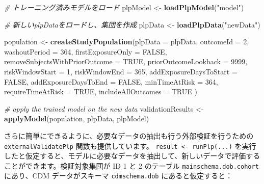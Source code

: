 \documentclass[
  11pt]{book}
\newenvironment{Shaded}{\begin{snugshade}}{\end{snugshade}}
\newcommand{\AttributeTok}[1]{\textcolor[rgb]{0.13,0.29,0.53}{#1}}
\newcommand{\CommentTok}[1]{\textcolor[rgb]{0.56,0.35,0.01}{\textit{#1}}}
\newcommand{\ConstantTok}[1]{\textcolor[rgb]{0.56,0.35,0.01}{#1}}
\newcommand{\DecValTok}[1]{\textcolor[rgb]{0.00,0.00,0.81}{#1}}
\newcommand{\FunctionTok}[1]{\textcolor[rgb]{0.13,0.29,0.53}{\textbf{#1}}}
\newcommand{\NormalTok}[1]{#1}
\newcommand{\OtherTok}[1]{\textcolor[rgb]{0.56,0.35,0.01}{#1}}
\newcommand{\StringTok}[1]{\textcolor[rgb]{0.31,0.60,0.02}{#1}}
\theoremstyle{definition}
\theoremstyle{definition}
\theoremstyle{definition}
\theoremstyle{definition}
\theoremstyle{remark}
\begin{document}
\begin{Shaded}
\begin{Highlighting}[]
\CommentTok{\# トレーニング済みモデルをロード}
\NormalTok{plpModel }\OtherTok{\textless{}{-}} \FunctionTok{loadPlpModel}\NormalTok{(}\StringTok{"model"}\NormalTok{)}

\CommentTok{\# 新しいplpDataをロードし、集団を作成}
\NormalTok{plpData }\OtherTok{\textless{}{-}} \FunctionTok{loadPlpData}\NormalTok{(}\StringTok{"newData"}\NormalTok{)}

\NormalTok{population }\OtherTok{\textless{}{-}} \FunctionTok{createStudyPopulation}\NormalTok{(}\AttributeTok{plpData =}\NormalTok{ plpData,}
                                    \AttributeTok{outcomeId =} \DecValTok{2}\NormalTok{,}
                                    \AttributeTok{washoutPeriod =} \DecValTok{364}\NormalTok{,}
                                    \AttributeTok{firstExposureOnly =} \ConstantTok{FALSE}\NormalTok{,}
                                    \AttributeTok{removeSubjectsWithPriorOutcome =} \ConstantTok{TRUE}\NormalTok{,}
                                    \AttributeTok{priorOutcomeLookback =} \DecValTok{9999}\NormalTok{,}
                                    \AttributeTok{riskWindowStart =} \DecValTok{1}\NormalTok{,}
                                    \AttributeTok{riskWindowEnd =} \DecValTok{365}\NormalTok{,}
                                    \AttributeTok{addExposureDaysToStart =} \ConstantTok{FALSE}\NormalTok{,}
                                    \AttributeTok{addExposureDaysToEnd =} \ConstantTok{FALSE}\NormalTok{,}
                                    \AttributeTok{minTimeAtRisk =} \DecValTok{364}\NormalTok{,}
                                    \AttributeTok{requireTimeAtRisk =} \ConstantTok{TRUE}\NormalTok{,}
                                    \AttributeTok{includeAllOutcomes =} \ConstantTok{TRUE}
\NormalTok{)}

\CommentTok{\# apply the trained model on the new data}
\NormalTok{validationResults }\OtherTok{\textless{}{-}} \FunctionTok{applyModel}\NormalTok{(population, plpData, plpModel)}
\end{Highlighting}
\end{Shaded}

さらに簡単にできるように、必要なデータの抽出も行う外部検証を行うための \texttt{externalValidatePlp} 関数も提供しています。 \texttt{result\ \textless{}-\ runPlp(...)} を実行したと仮定すると、モデルに必要なデータを抽出して、新しいデータで評価することができます。検証対象集団が ID 1 と 2 のテーブル \texttt{mainschema.dob.cohort} にあり、CDM データがスキーマ \texttt{cdmschema.dob} にあると仮定すると：
\end{document}
